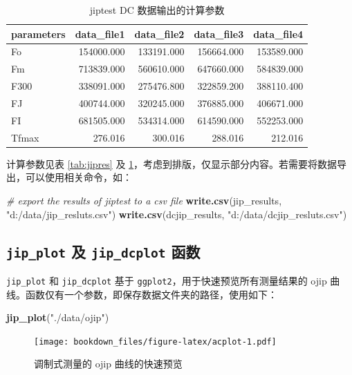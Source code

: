 \documentclass[
]{krantz}
\makeatletter
\newenvironment{Shaded}{\begin{snugshade}}{\end{snugshade}}
\newcommand{\CommentTok}[1]{\textcolor[rgb]{0.56,0.35,0.01}{\textit{#1}}}
\newcommand{\KeywordTok}[1]{\textcolor[rgb]{0.13,0.29,0.53}{\textbf{#1}}}
\newcommand{\NormalTok}[1]{#1}
\newcommand{\StringTok}[1]{\textcolor[rgb]{0.31,0.60,0.02}{#1}}
\newenvironment{kframe}{%
\medskip{}
\setlength{\fboxsep}{.8em}
 \def\at@end@of@kframe{}%
 \ifinner\ifhmode%
  \def\at@end@of@kframe{\end{minipage}}%
  \begin{minipage}{\columnwidth}%
 \fi\fi%
 \def\FrameCommand##1{\hskip\@totalleftmargin \hskip-\fboxsep
 \colorbox{shadecolor}{##1}\hskip-\fboxsep
     \hskip-\linewidth \hskip-\@totalleftmargin \hskip\columnwidth}%
 \MakeFramed {\advance\hsize-\width
   \@totalleftmargin\z@ \linewidth\hsize
   \@setminipage}}%
 {\par\unskip\endMakeFramed%
 \at@end@of@kframe}
\renewenvironment{Shaded}{\begin{kframe}}{\end{kframe}}
\makeatother
\begin{document}
\begin{longtable}[t]{lrrrr}
\caption{\label{tab:dcjipres}jiptest DC 数据输出的计算参数}\\
\toprule
parameters & data\_file1 & data\_file2 & data\_file3 & data\_file4\\
\midrule
Fo & 154000.000 & 133191.000 & 156664.000 & 153589.000\\
Fm & 713839.000 & 560610.000 & 647660.000 & 584839.000\\
F300 & 338091.000 & 275476.800 & 322859.200 & 388110.400\\
FJ & 400744.000 & 320245.000 & 376885.000 & 406671.000\\
FI & 681505.000 & 534314.000 & 614590.000 & 552253.000\\
\addlinespace
Tfmax & 276.016 & 300.016 & 288.016 & 212.016\\
\bottomrule
\end{longtable}

计算参数见表 \ref{tab:jipres} 及 \ref{tab:dcjipres}，考虑到排版，仅显示部分内容。若需要将数据导出，可以使用相关命令，如：

\begin{Shaded}
\begin{Highlighting}[]
\CommentTok{# export the results of jiptest to a csv file}
\KeywordTok{write.csv}\NormalTok{(jip_results, }\StringTok{"d:/data/jip_resluts.csv"}\NormalTok{)}
\KeywordTok{write.csv}\NormalTok{(dcjip_results, }\StringTok{"d:/data/dcjip_resluts.csv"}\NormalTok{)}
\end{Highlighting}
\end{Shaded}

\hypertarget{plotfluor}{%
\subsection{\texorpdfstring{\texttt{jip\_plot} 及 \texttt{jip\_dcplot} 函数}{jip\_plot 及 jip\_dcplot 函数}}\label{plotfluor}}

\texttt{jip\_plot} 和 \texttt{jip\_dcplot} 基于 \texttt{ggplot2}，用于快速预览所有测量结果的 ojip 曲线。函数仅有一个参数，即保存数据文件夹的路径，使用如下：

\begin{Shaded}
\begin{Highlighting}[]
\KeywordTok{jip_plot}\NormalTok{(}\StringTok{"./data/ojip"}\NormalTok{)}
\end{Highlighting}
\end{Shaded}

\begin{figure}
\centering
\texttt{[image: bookdown\_files/figure-latex/acplot-1.pdf]}
\caption{\label{fig:acplot}调制式测量的 ojip 曲线的快速预览}
\end{figure}
\end{document}
